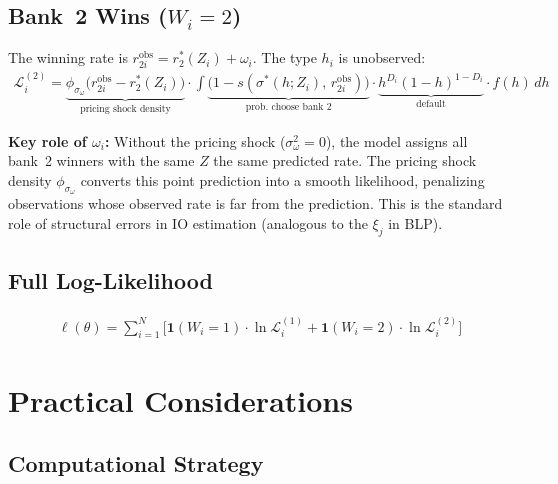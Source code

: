 \documentclass[12pt]{article}
\theoremstyle{plain}
\theoremstyle{plain}
\theoremstyle{definition}  %
\theoremstyle{remark}  %
\begin{document}
\subsection{Bank~2 Wins ($W_i = 2$)}

The winning rate is $r_{2i}^{\text{obs}} = r_2^*(Z_i) + \omega_i$. The type $h_i$ is unobserved:
\begin{align}\label{eq:L2_het}
    \mathcal{L}_i^{(2)} = \underbrace{\phi_{\sigma_\omega}\!\big(r_{2i}^{\text{obs}} - r_2^*(Z_i)\big)}_{\text{pricing shock density}} \cdot \int \underbrace{\big(1-s(\sigma^*(h; Z_i),\, r_{2i}^{\text{obs}})\big)}_{\text{prob.\ choose bank~2}} \cdot \underbrace{h^{D_i}(1-h)^{1-D_i}}_{\text{default}} \cdot f(h)\, dh
\end{align}

\textbf{Key role of $\omega_i$:} Without the pricing shock ($\sigma_\omega^2 = 0$), the model assigns all bank~2 winners with the same $Z$ the same predicted rate. The pricing shock density $\phi_{\sigma_\omega}$ converts this point prediction into a smooth likelihood, penalizing observations whose observed rate is far from the prediction. This is the standard role of structural errors in IO estimation (analogous to the $\xi_j$ in BLP).

\subsection{Full Log-Likelihood}

\begin{align}\label{eq:loglik}
    \ell(\theta) = \sum_{i=1}^{N} \bigg[\mathbf{1}(W_i = 1) \cdot \ln \mathcal{L}_i^{(1)} + \mathbf{1}(W_i = 2) \cdot \ln \mathcal{L}_i^{(2)}\bigg]
\end{align}



\section{Practical Considerations}\label{sec:practical}

\subsection{Computational Strategy}
\end{document}
